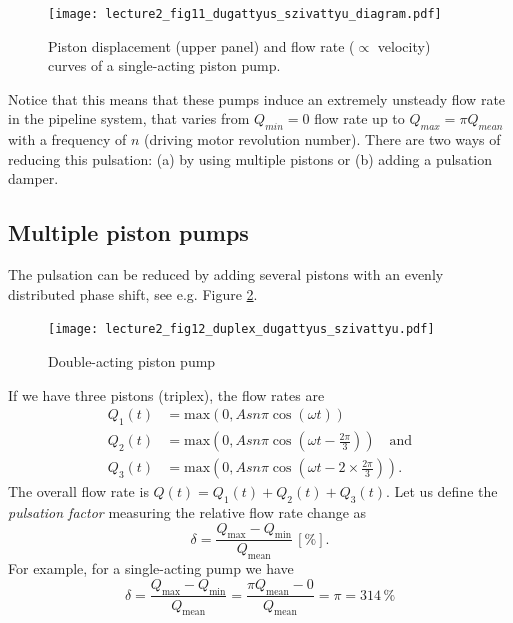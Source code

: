 \begin{figure}[th]
\begin{center}
\texttt{[image: lecture2\_fig11\_dugattyus\_szivattyu\_diagram.pdf]}
\caption{\label{fig:single_acting_piston_pump_curves} Piston displacement (upper panel) and flow rate ($\propto$ velocity) curves of a single-acting piston pump.}
\end{center}
\end{figure}

Notice that this means that these pumps induce an extremely unsteady flow rate in the pipeline system, that varies from $Q_{min}=0$ flow rate up to $Q_{max}=\pi Q_{mean}$ with a frequency of $n$ (driving motor revolution number). There are two ways of reducing this pulsation: (a) by using multiple pistons or (b) adding a pulsation damper.

\clearpage

\subsection{Multiple piston pumps}

The pulsation can be reduced by adding several pistons with an evenly distributed phase shift, see e.g. Figure \ref{fig:double_acting_piston_pump}. 

\begin{figure}[th]
\begin{center}
\texttt{[image: lecture2\_fig12\_duplex\_dugattyus\_szivattyu.pdf]}
\caption{\label{fig:double_acting_piston_pump}Double-acting piston pump}
\end{center}
\end{figure}

\noindent If we have three pistons (triplex), the flow rates are 
%
\begin{align*}
Q_1(t) &= \text{max}(0, A s n \pi\cos(\omega t))\\
Q_2(t) &= \text{max}(0, A s n \pi\cos(\omega t-\frac{2\pi}{3}))\quad \text{and}\\
Q_3(t) &= \text{max}(0, A s n \pi\cos(\omega t-2 \times\frac{2\pi}{3})).
\end{align*}
%
The overall flow rate is $Q(t)=Q_1(t)+Q_2(t)+Q_3(t)$. Let us define the \emph{pulsation factor} measuring the relative flow rate change as
%
\begin{equation}
\delta =\frac{Q_{\mathrm{max}}-Q_{\mathrm{min}}}{Q_{\mathrm{mean}}}\,[\%].
\end{equation}
%
For example, for a single-acting pump we have
\begin{equation}
\delta =\frac{Q_{\mathrm{max}}-Q_{\mathrm{min}}}{Q_{\mathrm{mean}}}=\frac{\pi Q_{\mathrm{mean}}-0}{Q_{\mathrm{mean}}}=\pi = 314\,\%
\end{equation}

